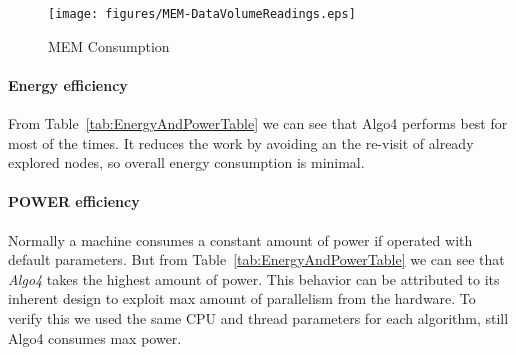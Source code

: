 \begin{figure}[t]
    \centering
    \texttt{[image: figures/MEM-DataVolumeReadings.eps]}
    \caption{MEM Consumption}
    \label{fig:MEM Consumption}
\end{figure}



\paragraph{Energy efficiency}
From Table~\ref{tab:EnergyAndPowerTable} we can see that Algo4 performs best for
most of the times. It reduces the work by avoiding an the re-visit of
already explored nodes, so overall energy consumption is minimal.

\paragraph{POWER efficiency}
Normally a machine consumes a constant amount of power if operated
with default parameters. But from Table~\ref{tab:EnergyAndPowerTable} we can see
that \emph{Algo4} takes the highest amount of power. This behavior can
be attributed to its inherent design to exploit max amount of
parallelism from the hardware.  To verify this we used the same
CPU and thread parameters for each algorithm, still Algo4 consumes max
power.




